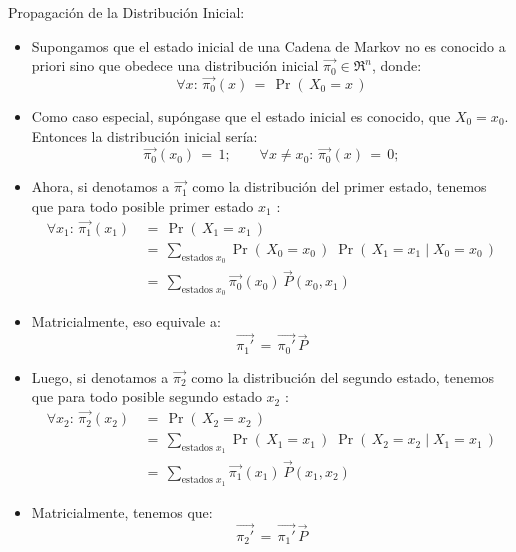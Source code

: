 \documentclass[ 10pt, xcolor = dvipsnames]{beamer}
\begin{document}
\begin{frame}[allowframebreaks]
\frametitle{\insertsubsection}

Propagaci\'on de la Distribuci\'on Inicial: 
\begin{itemize}
\item Supongamos que el estado inicial de una Cadena de Markov no es conocido \linebreak a priori sino que obedece una distribuci\'on inicial $\vec{\pi_0} \in \Re^n$, donde: 
\[
\forall x \colon \, \vec{\pi_0}(x) \, = \, \Pr( \, X_0 = x \, )
\]
\item Como caso especial, sup\'ongase que el estado inicial es conocido, \eg \linebreak que $X_0 = x_0$. Entonces la distribuci\'on inicial ser\'ia: 
\[
\vec{\pi_0}(x_0) \, = \, 1; \qquad
\forall x \neq x_0 \colon \, \vec{\pi_0}(x) \, = \, 0;
\]
\end{itemize}
\framebreak

\begin{itemize}
\item Ahora, si denotamos a $\vec{\pi_1}$ como la distribuci\'on del primer estado, \linebreak tenemos que para todo posible primer estado $x_1$ :
\begin{align*}
\forall x_1 \colon \, \vec{\pi_1}(x_1) \, 
& = \, \Pr( \, X_1 = x_1 \, ) \\[1ex]
& = \, \sum_{\text{estados } x_0} \Pr( \, X_0 = x_0 \, ) \; \Pr( \, X_1 = x_1 \mid X_0 = x_0 \, ) \\[1ex]
& = \, \sum_{\text{estados } x_0} \vec{\pi_0}(x_0) \, \vec{P}(x_0,x_1)
\end{align*}
\item Matricialmente, eso equivale a: 
\[
\vec{\pi_1'} \, = \, \vec{\pi_0'} \, \vec{P}
\]
\end{itemize}
\framebreak

\begin{itemize}
\item Luego, si denotamos a $\vec{\pi_2}$ como la distribuci\'on del segundo estado, \linebreak tenemos que para todo posible segundo estado $x_2$ :
\begin{align*}
\forall x_2 \colon \, \vec{\pi_2}(x_2) \,
& = \, \Pr( \, X_2 = x_2 \, ) \\[1ex]
& = \, \sum_{\text{estados } x_1} \Pr( \, X_1 = x_1 \, ) \; \Pr( \, X_2 = x_2 \mid X_1 = x_1 \, ) \\[1ex]
& = \, \sum_{\text{estados } x_1} \vec{\pi_1}(x_1) \, \vec{P}(x_1,x_2)
\end{align*}
\item Matricialmente, tenemos que: 
\[
\vec{\pi_2'} \, = \, \vec{\pi_1'} \, \vec{P}
\]
\end{itemize}
\framebreak


\end{frame}
\end{document}
